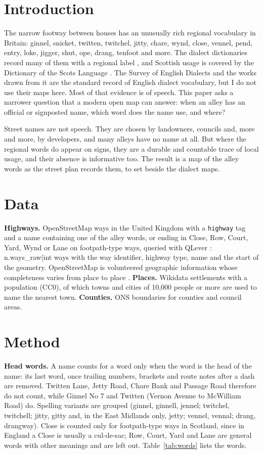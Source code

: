 \documentclass[11pt,a4paper]{article}
\begin{document}
\section{Introduction}
The narrow footway between houses has an unusually rich regional vocabulary in Britain: ginnel, snicket, twitten, twitchel, jitty, chare, wynd, close, vennel, pend, entry, loke, jigger, shut, ope, drang, tenfoot and more. The dialect dictionaries record many of them with a regional label \citep{wright1898}, and Scottish usage is covered by the Dictionary of the Scots Language \citep{dsl}. The Survey of English Dialects and the works drawn from it \citep{orton1962,upton1987,upton1994,upton1996} are the standard record of English dialect vocabulary, but I do not use their maps here. Most of that evidence is of speech. This paper asks a narrower question that a modern open map can answer: when an alley has an official or signposted name, which word does the name use, and where?

Street names are not speech. They are chosen by landowners, councils and, more and more, by developers, and many alleys have no name at all. But where the regional words do appear on signs, they are a durable and countable trace of local usage, and their absence is informative too. The result is a map of the alley words as the street plan records them, to set beside the dialect maps.

\section{Data}
\textbf{Highways.} OpenStreetMap ways in the United Kingdom with a \texttt{highway} tag and a name containing one of the alley words, or ending in Close, Row, Court, Yard, Wynd or Lane on footpath-type ways, queried with QLever \citep{bast2017}: {{n.ways_raw|int}} ways with the way identifier, highway type, name and the start of the geometry. OpenStreetMap is volunteered geographic information whose completeness varies from place to place \citep{haklay2010}. \textbf{Places.} Wikidata settlements with a population (CC0), of which towns and cities of 10,000 people or more are used to name the nearest town. \textbf{Counties.} ONS boundaries for counties and council areas.

\section{Method}
\textbf{Head words.} A name counts for a word only when the word is the head of the name: its last word, once trailing numbers, brackets and route notes after a dash are removed. Twitten Lane, Jetty Road, Chare Bank and Passage Road therefore do not count, while Ginnel No 7 and Twitten (Vernon Avenue to McWilliam Road) do. Spelling variants are grouped (ginnel, ginnell, jennel; twitchel, twitchell; jitty, gitty and, in the East Midlands only, jetty; vennel, vennal; drang, drangway). Close is counted only for footpath-type ways in Scotland, since in England a Close is usually a cul-de-sac; Row, Court, Yard and Lane are general words with other meanings and are left out. Table~\ref{tab:words} lists the words.
\end{document}
